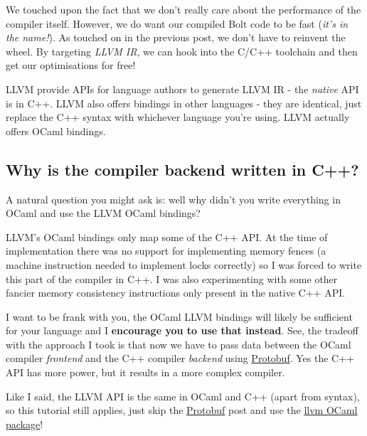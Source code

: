 We touched upon the fact that we don't really care about the performance
of the compiler itself. However, we do want our compiled Bolt code to be
fast (\emph{it's in the name!}). As touched on in the previous post, we
don't have to reinvent the wheel. By targeting \emph{LLVM IR}, we can
hook into the C/C++ toolchain and then get our optimisations for free!

LLVM provide APIs for language authors to generate LLVM IR - the
\emph{native} API is in C++. LLVM also offers bindings in other
languages - they are identical, just replace the C++ syntax with
whichever language you're using. LLVM actually offers OCaml bindings.

\hypertarget{why-is-the-compiler-backend-written-in-c}{%
\subsection{\texorpdfstring{\protect\hyperlink{why-is-the-compiler-backend-written-in-c}{}Why
is the compiler backend written in
C++?}{Why is the compiler backend written in C++?}}\label{why-is-the-compiler-backend-written-in-c}}

A natural question you might ask is: well why didn't you write
everything in OCaml and use the LLVM OCaml bindings?

LLVM's OCaml bindings only map some of the C++ API. At the time of
implementation there was no support for implementing memory fences (a
machine instruction needed to implement locks correctly) so I was forced
to write this part of the compiler in C++. I was also experimenting with
some other fancier memory consistency instructions only present in the
native C++ API.

I want to be frank with you, the OCaml LLVM bindings will likely be
sufficient for your language and I \textbf{encourage you to use that
instead}. See, the tradeoff with the approach I took is that now we have
to pass data between the OCaml compiler \emph{frontend} and the C++
compiler \emph{backend} using
\href{https://mukulrathi.com/create-your-own-programming-language/protobuf-ocaml-cpp-tutorial/}{Protobuf}.
Yes the C++ API has more power, but it results in a more complex
compiler.

Like I said, the LLVM API is the same in OCaml and C++ (apart from
syntax), so this tutorial still applies, just skip the
\href{https://mukulrathi.com/create-your-own-programming-language/protobuf-ocaml-cpp-tutorial/}{Protobuf}
post and use the \href{https://opam.ocaml.org/packages/llvm/}{llvm OCaml
package}!

